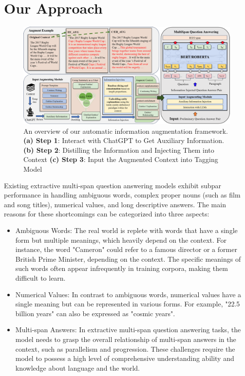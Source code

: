 \documentclass[a4paper,fleqn]{cas-dc}
\newcommand{\1}[1]{\mathds{1}\left[#1\right]}
\begin{document}
\section{Our Approach}

	\begin{figure}[h]
	\centering
	\includegraphics[width=14.0cm]{overview.png}
	\caption{An overview of our automatic information augmentation framework. \textbf{(a) Step 1}: Interact with ChatGPT to Get Auxiliary Information. \textbf{(b) Step 2}: Distilling the Information and Injecting Them into Context \textbf{(c) Step 3}: Input the Augmented Context into Tagging Model}
	\label{fig:overview}
	\end{figure}   


	Existing extractive multi-span question answering models exhibit subpar performance in handling ambiguous words, complex proper nouns (such as film and song titles), numerical values, and long descriptive answers. The main reasons for these shortcomings can be categorized into three aspects:
	\begin{itemize}
		\item Ambiguous Words: The real world is replete with words that have a single form but multiple meanings, which heavily depend on the context. For instance, the word "Cameron" could refer to a famous director or a former British Prime Minister, depending on the context. The specific meanings of such words often appear infrequently in training corpora, making them difficult to learn.
		\item Numerical Values: In contrast to ambiguous words, numerical values have a single meaning but can be represented in various forms. For example, "22.5 billion years" can also be expressed as "cosmic years".
		\item Multi-span Answers: In extractive multi-span question answering tasks, the model needs to grasp the overall relationship of multi-span answers in the context, such as parallelism and progression.
		These challenges require the model to possess a high level of comprehensive understanding ability and knowledge about language and the world.
	\end{itemize}
	
\end{document}
